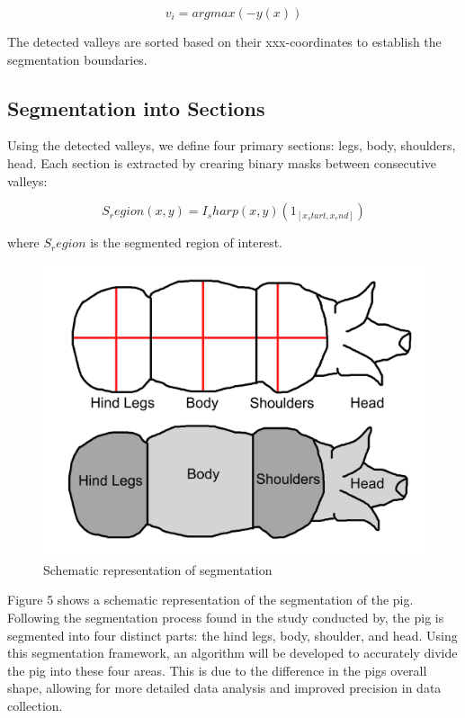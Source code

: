 {\begin{equation}
	v_i=arg max(-y(x))
\end{equation}

The detected valleys are sorted based on their xxx-coordinates to establish the segmentation boundaries.

\subsection{Segmentation into Sections}
Using the detected valleys, we define four primary sections: legs, body, shoulders, head. Each section is extracted by crearing binary masks between consecutive valleys:

\begin{equation}
	S_region (x,y) = I_sharp (x,y) (1_[x_start,x_end])
\end{equation}

where $S_region$ is the segmented region of interest.

\begin{figure}[h]
	\centering
	\includegraphics[height=0.4\textheight]{figures/Untitled-1 (1)}
	\caption{Schematic representation of segmentation}
	\label{fig: Schematic representation of segmentation}
\end{figure}

Figure 5 shows a schematic representation of the segmentation of the pig. Following the segmentation process found in the study conducted by, the pig is segmented into four distinct parts: the hind legs, body, shoulder, and head. Using this segmentation framework, an algorithm will be developed to accurately divide the pig into these four areas. This is due to the difference in the pigs overall shape, allowing for more detailed data analysis and improved precision in data collection.

}

